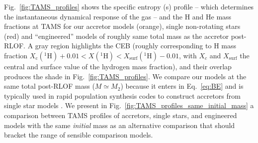 \documentclass[twocolumn,twocolappendix,trackchanges]{aastex63}
\DeclareRobustCommand{\Eqref}[1]{Eq.~\ref{#1}}
\DeclareRobustCommand{\Figref}[1]{Fig.~\ref{#1}}
\begin{document}
\Figref{fig:TAMS_profiles} shows the specific entropy (s) profile --
which determines the instantaneous dynamical response of the gas -- and
the H and He mass fractions at TAMS for our accretor models (orange),
single non-rotating stars (red) and ``engineered'' models of roughly
same total mass as the accretor post-RLOF. A gray region highlights
the CEB (roughly corresponding to H mass fraction
$X_\mathrm{c}(^1\mathrm{H})+0.01<X(^1\mathrm{H})<X_\mathrm{surf}(^1\mathrm{H})-0.01$,
with $X_c$ and $X_\mathrm{surf}$ the central and surface value of the
hydrogen mass fraction), and their overlap produces the shade in
\Figref{fig:TAMS_profiles}.
We compare our
models at the same total post-RLOF mass ($M\simeq M_{2}$) because it enters in \Eqref{eq:BE} and
is typically used in rapid population synthesis codes to construct
accretors from single star models \citep[e.g.,][]{hurley:2002}.  We present in
\Figref{fig:TAMS_profiles_same_initial_mass} a comparison between TAMS profiles of
accretors, single stars, and engineered models with the same
\emph{initial} mass as an alternative comparison that should bracket
the range of sensible comparison models.
\end{document}
